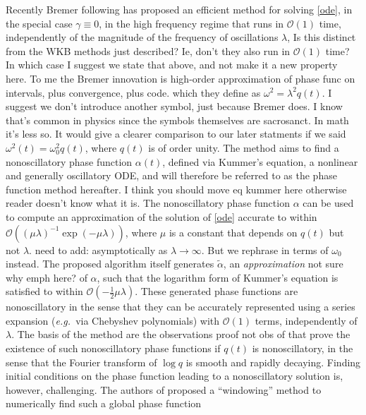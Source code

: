 \documentclass[10pt]{article}
\newcommand{\eg}{{\it e.g.\ }}
\newcommand{\bigO}{{\mathcal O}}
\newcommand{\om}{\omega}
\newcommand{\g}{\gamma}
\newcommand{\AB}[1]{{\color{orange}#1}}
\begin{document}
Recently Bremer \cite{bremer2018} following \cite{heitman2015,bremer2016} has proposed an efficient
method for solving \cref{ode}, in the special case $\g\equiv 0$,
in the high frequency regime that runs
in $\bigO(1)$ time, independently of the magnitude of the frequency of
oscillations $\lambda$,
\AB{Is this distinct from the WKB methods just described?
  Ie, don't they also run in $\bigO(1)$ time?
  In which case I suggest we state that above, and not make it a new property here.
  To me the Bremer innovation is high-order approximation of phase func
  on intervals,
  plus convergence, plus code.}
which they define as $\om^2 = \lambda^2 q(t)$.
\AB{I suggest we don't introduce another symbol,
  just because Bremer does. I know that's common in physics since
  the symbols themselves are sacrosanct. In math it's less so.
  It would give a clearer comparison to our later statments
  if we said $\om^2(t) = \om_0^2 q(t)$, where $q(t)$ is of order unity.}
  The method aims to find a nonoscillatory phase function $\alpha(t)$, defined
via Kummer's equation, a nonlinear and generally oscillatory ODE, and will therefore be
referred to as the phase function method hereafter.
\AB{I think you should move eq {kummer} here otherwise reader doesn't know what it is}.
The nonoscillatory phase function $\alpha$ can be used to compute an approximation
of the solution of \cref{ode} accurate to within
$\bigO((\mu\lambda)^{-1}\exp(-\mu\lambda))$, where $\mu$ is a constant that depends on $q(t)$ but not $\lambda$.
\AB{need to add: asymptotically as  $\lambda\to\infty$. But we rephrase
in terms of $\om_0$ instead.}
The proposed algorithm itself generates $\tilde{\alpha}$, an
\emph{approximation}
\AB{not sure why emph here?}
of $\alpha$, such that the logarithm form of Kummer's
equation is satisfied to within $\bigO(-\tfrac{1}{2}\mu\lambda)$. These
generated phase functions are nonoscillatory in the sense that they can be
accurately represented using a series expansion (\eg via Chebyshev polynomials)
with $\bigO(1)$ terms, independently of $\lambda$.
The basis of the method are the observations
\AB{proof not obs}
of \cite{heitman2015,bremer2016}
that prove the existence of such nonoscillatory phase functions if $q(t)$ is
nonoscillatory, in the sense that the Fourier transform of $\log q$ is smooth
and rapidly decaying.
Finding initial conditions on the phase function leading to
a nonoscillatory solution is, however, challenging.
The authors of \cite{bremer2018} proposed a ``windowing'' method to numerically find such a global phase function
\end{document}
